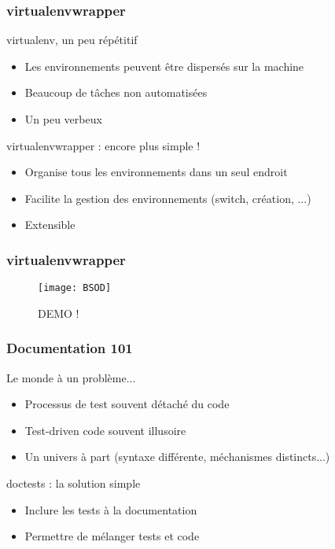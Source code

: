 \documentclass{beamer}
\begin{document}
\begin{frame}
  \frametitle{virtualenvwrapper}

  \begin{block}{virtualenv, un peu répétitif}
    \begin{itemize}
    \item Les environnements peuvent être dispersés sur la machine
    \item Beaucoup de tâches non automatisées
    \item Un peu verbeux
    \end{itemize}
  \end{block}

  \begin{block}{virtualenvwrapper : encore plus simple !}
    \begin{itemize}
    \item Organise tous les environnements dans un seul endroit
    \item Facilite la gestion des environnements (switch, création, ...)
    \item Extensible
    \end{itemize}
  \end{block}

\end{frame}

\begin{frame}
  \frametitle{virtualenvwrapper}

  \begin{figure}[!h]
    \centering
    \texttt{[image: BSOD]}
    \caption{DEMO !}
    \label{fig:virtualenvwrapperdemo}
  \end{figure}

\end{frame}

\begin{frame}
  \frametitle{Documentation 101}

  \begin{block}{Le monde à un problème...}
    \begin{itemize}
    \item Processus de test souvent détaché du code
    \item Test-driven code souvent illusoire
    \item Un univers à part (syntaxe différente, méchanismes
      distincts...)
    \end{itemize}
  \end{block}

  \begin{block}{doctests : la solution simple}
    \begin{itemize}
    \item Inclure les tests à la documentation
    \item Permettre de mélanger tests et code
    \end{itemize}
  \end{block}

\end{frame}
\end{document}
